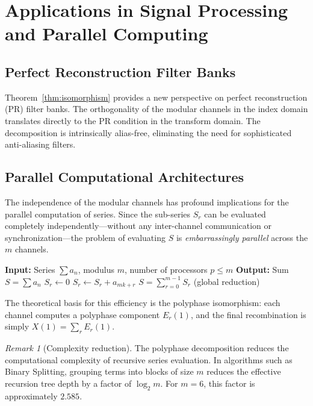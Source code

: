 \documentclass{article}
\theoremstyle{plain}
\theoremstyle{definition}
\theoremstyle{remark}
\newtheorem{remark}[theorem]{Remark}
\begin{document}
\section{Applications in Signal Processing and Parallel Computing}
\label{sec:DSP}

\subsection{Perfect Reconstruction Filter Banks}
Theorem~\ref{thm:isomorphism} provides a new perspective on perfect reconstruction (PR) filter banks. The orthogonality of the modular channels in the index domain translates directly to the PR condition in the transform domain. The decomposition is intrinsically alias-free, eliminating the need for sophisticated anti-aliasing filters.

\subsection{Parallel Computational Architectures}
The independence of the modular channels has profound implications for the parallel computation of series. Since the sub-series \(S_r\) can be evaluated completely independently---without any inter-channel communication or synchronization---the problem of evaluating \(S\) is \emph{embarrassingly parallel} across the \(m\) channels.

\begin{algorithm}[H]
\caption{Shared-Nothing Parallel Series Evaluation}
\label{alg:parallel}
\begin{algorithmic}[1]
\State \textbf{Input:} Series \(\sum a_n\), modulus \(m\), number of processors \(p \le m\)
\State \textbf{Output:} Sum \(S = \sum a_n\)
    \State \(S_r \gets 0\)
        \State \(S_r \gets S_r + a_{mk + r}\)
    \EndFor
\EndFor
\State \Return \(S = \sum_{r=0}^{m-1} S_r\) (global reduction)
\end{algorithmic}
\end{algorithm}

The theoretical basis for this efficiency is the polyphase isomorphism: each channel computes a polyphase component \(E_r(1)\), and the final recombination is simply \(X(1) = \sum_r E_r(1)\).

\begin{remark}[Complexity reduction]
The polyphase decomposition reduces the computational complexity of recursive series evaluation. In algorithms such as Binary Splitting, grouping terms into blocks of size \(m\) reduces the effective recursion tree depth by a factor of \(\log_2 m\). For \(m=6\), this factor is approximately \(2.585\).
\end{remark}
\end{document}
